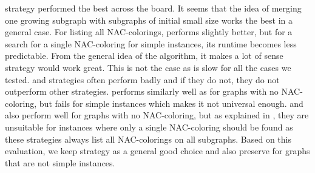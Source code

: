 \MergeLinear{} strategy performed the best across the board.
It seems that the idea of merging one growing subgraph
with subgraphs of initial small size works the best
in a general case.
%
For listing all NAC-colorings, \SharedVertices{} performs
slightly better, but for a search for a single NAC-coloring for simple instances,
its runtime becomes less predictable.
%
From the general idea of the \Subgraphs{} algorithm,
it makes a lot of sense \Log{} strategy would work great.
This is not the case as \Log{} is slow for all the cases we tested.
%
\MinMax{} and \SortedBits{} strategies often perform badly
and if they do not, they do not outperform other strategies.
%
\PromisingCycles{} performs similarly well as \Neighbors{}
for graphs with no NAC-coloring,
but fails for simple instances which makes it not universal enough.
%
\SortedSize{} and \Score{} also perform well for graphs with no NAC-coloring,
but as explained in ,
they are unsuitable for instances where only a single NAC-coloring
should be found as these strategies always list all NAC-colorings
on all subgraphs.
%
Based on this evaluation, we keep strategy \MergeLinear{} as a general good choice
and also preserve \SharedVertices{} for graphs that are not simple instances.


